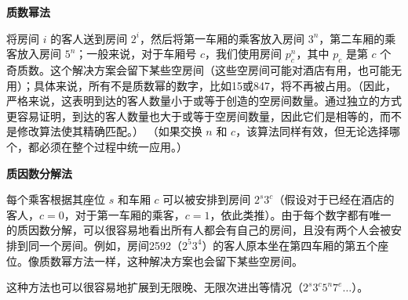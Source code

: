 \textbf{质数幂法}  

将房间 \( i \) 的客人送到房间 \( 2^i \)，然后将第一车厢的乘客放入房间 \( 3^n \)，第二车厢的乘客放入房间 \( 5^n \)；一般来说，对于车厢号 \( c \)，我们使用房间 \( p_c^n \)，其中 \( p_c \) 是第 \( c \) 个奇质数。这个解决方案会留下某些空房间（这些空房间可能对酒店有用，也可能无用）；具体来说，所有不是质数幂的数字，比如15或847，将不再被占用。（因此，严格来说，这表明到达的客人数量小于或等于创造的空房间数量。通过独立的方式更容易证明，到达的客人数量也大于或等于空房间数量，因此它们是相等的，而不是修改算法使其精确匹配。）  
（如果交换 \( n \) 和 \( c \)，该算法同样有效，但无论选择哪个，都必须在整个过程中统一应用。）

\textbf{质因数分解法 } 

每个乘客根据其座位 \( s \) 和车厢 \( c \) 可以被安排到房间 \( 2^s 3^c \)（假设对于已经在酒店的客人，\( c = 0 \)，对于第一车厢的乘客，\( c = 1 \)，依此类推）。由于每个数字都有唯一的质因数分解，可以很容易地看出所有人都会有自己的房间，且没有两个人会被安排到同一个房间。例如，房间2592（\( 2^5 3^4 \)）的客人原本坐在第四车厢的第五个座位。像质数幂方法一样，这种解决方案也会留下某些空房间。

这种方法也可以很容易地扩展到无限晚、无限次进出等情况（\( 2^s 3^c 5^n 7^e \dots \)）。